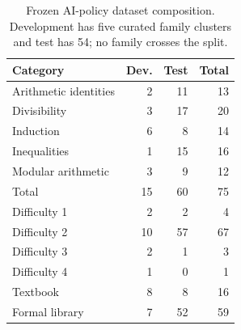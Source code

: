 \begin{table}[t]
\centering
\caption{Frozen AI-policy dataset composition. Development has five curated family clusters and test has 54; no family crosses the split.}
\label{tab:dataset}
\small
\begin{tabular}{lrrr}
\toprule
Category & Dev. & Test & Total \\
\midrule
Arithmetic identities & 2 & 11 & 13 \\
Divisibility & 3 & 17 & 20 \\
Induction & 6 & 8 & 14 \\
Inequalities & 1 & 15 & 16 \\
Modular arithmetic & 3 & 9 & 12 \\
Total & 15 & 60 & 75 \\
Difficulty 1 & 2 & 2 & 4 \\
Difficulty 2 & 10 & 57 & 67 \\
Difficulty 3 & 2 & 1 & 3 \\
Difficulty 4 & 1 & 0 & 1 \\
Textbook & 8 & 8 & 16 \\
Formal library & 7 & 52 & 59 \\
\bottomrule
\end{tabular}
\end{table}

